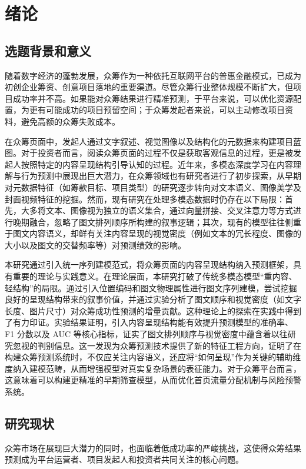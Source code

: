 \section{绪论}
\subsection{选题背景和意义}
随着数字经济的蓬勃发展，众筹作为一种依托互联网平台的普惠金融模式，已成为初创企业筹资、创意项目落地的重要渠道。尽管众筹行业整体规模不断扩大，但项目成功率并不高。如果能对众筹结果进行精准预测，于平台来说，可以优化资源配置，为更有可能成功的项目预留空间；于众筹发起者来说，可以主动修改项目资料，避免高额的众筹失败成本。

在众筹页面中，发起人通过文字叙述、视觉图像以及结构化的元数据来构建项目蓝图。对于投资者而言，阅读众筹页面的过程不仅是获取客观信息的过程，更是被发起人按照特定的内容呈现结构引导认知的过程。近年来，多模态深度学习在内容理解与行为预测中展现出巨大潜力，在众筹领域也有研究者进行了初步探索，从早期对元数据特征（如筹款目标、项目类型）的研究逐步转向对文本语义、图像美学及封面视频特征的挖掘。然而，现有研究在处理多模态数据时仍存在以下局限：首先，大多将文本、图像视为独立的语义集合，通过向量拼接、交叉注意力等方式进行晚期融合，忽略了图文排列顺序所构建的叙事逻辑；其次，现有的模型往往侧重于图文内容语义，却鲜有关注内容呈现的视觉密度（例如文本的冗长程度、图像的大小以及图文的交替频率等）对预测绩效的影响。

本研究通过引入统一序列建模范式，将众筹页面的内容呈现结构纳入预测框架，具有重要的理论与实践意义。在理论层面，本研究打破了传统多模态模型“重内容、轻结构”的局限。通过引入位置编码和图文物理属性进行图文序列建模，尝试挖掘良好的呈现结构带来的叙事价值，并通过实验分析了图文顺序和视觉密度（如文字长度、图片尺寸）对众筹成功性预测的增量贡献。这种理论上的探索在实践中得到了有力印证。实验结果证明，引入内容呈现结构能有效提升预测模型的准确率、F1 分数以及 AUC 等核心指标，证实了图文排列顺序与视觉密度中蕴含着以往研究忽视的判别信息。这一发现为众筹预测技术提供了新的特征工程方向，证明了在构建众筹预测系统时，不仅应关注内容语义，还应将“如何呈现”作为关键的辅助维度纳入建模范畴，从而增强模型对真实复杂场景的表征能力。对于众筹平台而言，这意味着可以构建更精准的早期筛查模型，从而优化首页流量分配机制与风险预警系统。

\subsection{研究现状}
众筹市场在展现巨大潜力的同时，也面临着低成功率的严峻挑战，这使得众筹结果预测成为平台运营者、项目发起人和投资者共同关注的核心问题。

